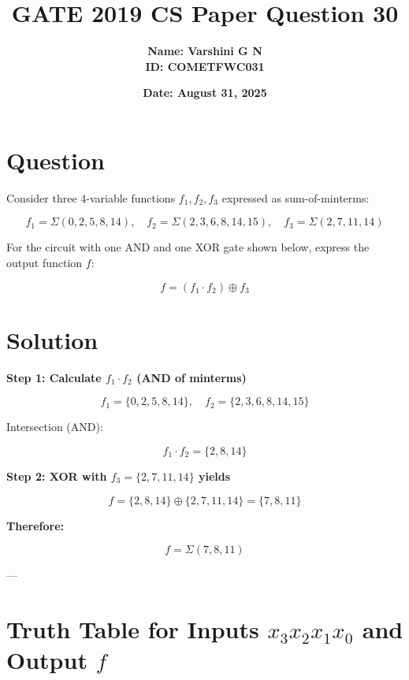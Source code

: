 \documentclass[12pt,a4paper]{article}
\author{\textbf{Name: Varshini G N} \\ \textbf{ID: COMETFWC031}}
\date{\textbf{Date: August 31, 2025}}
\title{\textbf{GATE 2019 CS Paper Question 30}}
\begin{document}
\maketitle
\vspace{-1cm} %

\section*{Question}

Consider three 4-variable functions \( f_1, f_2, f_3 \) expressed as sum-of-minterms:

\[
f_1 = \Sigma(0, 2, 5, 8, 14), \quad
f_2 = \Sigma(2, 3, 6, 8, 14, 15), \quad
f_3 = \Sigma(2, 7, 11, 14)
\]

For the circuit with one AND and one XOR gate shown below, express the output function \( f \):

\[
f = (f_1 \cdot f_2) \oplus f_3
\]

\section*{Solution}

\textbf{Step 1: Calculate \(f_1 \cdot f_2\) (AND of minterms)}

\[
f_1 = \{0, 2, 5, 8, 14\}, \quad f_2 = \{2, 3, 6, 8, 14, 15\}
\]

Intersection (AND):

\[
f_1 \cdot f_2 = \{2, 8, 14\}
\]

\textbf{Step 2: XOR with \(f_3 = \{2, 7, 11, 14\}\) yields}

\[
f = \{2, 8, 14\} \oplus \{2, 7, 11, 14\} = \{7, 8, 11\}
\]

\textbf{Therefore:}

\[
f = \Sigma(7, 8, 11)
\]

---

\section*{Truth Table for Inputs \(x_3 x_2 x_1 x_0\) and Output \(f\)}
\end{document}
